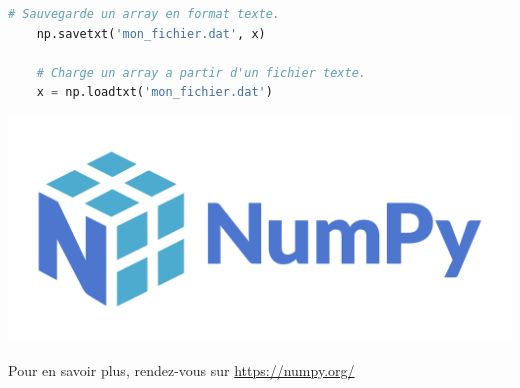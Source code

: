 \documentclass[aspectratio=169]{beamer}
\begin{document}
\begin{frame}[fragile]{}{}
  \vfill
  \begin{lstlisting}[language=Python]
    # Sauvegarde un array en format texte.
    np.savetxt('mon_fichier.dat', x)

    # Charge un array a partir d'un fichier texte.
    x = np.loadtxt('mon_fichier.dat')
  \end{lstlisting}
  \vfill
\end{frame}

\begin{frame}
  \centering

  \includegraphics[width=.5\textwidth]{numpy_logo}

  Pour en savoir plus, rendez-vous sur \url{https://numpy.org/}
\end{frame}
\end{document}
